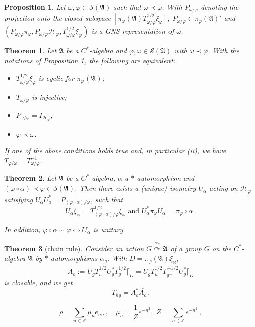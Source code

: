 \documentclass[10pt,a4paper]{amsart}
\newtheorem{thm}{Theorem}
\newtheorem{prop}{Proposition}
\def\a{\alpha}
\def\ch{{\mathcal H}}
\def\cs{{\mathcal S}}
\def\f{\varphi}\def\ff{\phi} \def\F{\Phi}
\def\ga{{\mathfrak A}} \def\gpa{{\mathfrak a}}
\def\om{\omega} \def\Om{\Omega}
\begin{document}
\begin{prop}
\label{pi}
Let $\omega,\varphi\in\cs(\ga)$ such that $\omega\prec\varphi$. With $P_{\om/\f}$ denoting the projection onto the closed subspace $[\pi_\f(\ga)T^{1/2}_{\om/\f}\xi_\f]$, $P_{\om/\f}\in\pi_\f(\ga)'$ and 
$(P_{\om/\f}\pi_\f,  P_{\om/\f}\ch_\f, T^{1/2}_{\om/\f}\xi_\f)$ is a GNS representation of $\om$.
\end{prop}

\begin{thm}
\label{invinv}
Let $\ga$ be a $C^*$-algebra and $\f,\om\in\cs(\ga)$ with $\om\prec\f$. 
With the notations of Proposition \ref{pi}, the following are equivalent:
\begin{itemize}
\item[(i)] $T_{\om/\f}^{1/2}\xi_\f$ is cyclic for $\pi_\f(\ga)$;
\item[(ii)] $T_{\om/\f}$ is injective;
\item[(iii)] $P_{\om/\f}=I_{\mathcal H_\varphi}$;
\item[(iv)]  $\f\prec\om$.
\end{itemize}
If one of the above conditions holds true and, in particular (ii),
we have $T_{\f/\om}=T_{\om/\f}^{-1}$.
\end{thm}

\begin{thm}
\label{twogns}
Let $\ga$ be a $C^*$-algebra, $\a$ a $*$-automorphism and $(\f\circ\a)\prec\f\in\cs(\ga)$. Then there exists a (unique) isometry $U_\a$ acting on $\ch_\f$ satisfying $U_\a U_a^*=P_{(\f\circ\a)/\f}$, such that
$$
U_\a\xi_\f=T^{1/2}_{(\f\circ\a)/\f}\xi_\f\,\,\text{and}\,\, U^*_\a\pi_\f U_\a=\pi_\f\circ\a\,.
$$

In addition, $\f\circ\a\sim\f\iff U_\a$ is unitary.
\end{thm}

\begin{thm}[chain rule]
\label{lenire}
Consider an action $G\stackrel{\a_g}{\curvearrowright}\ga$ of a group $G$ on the $C^*$-algebra $\ga$ by $*$-automorphisms $\a_g$. With $D=\pi_\f(\ga)\xi_\f$, 
\begin{equation}
\label{relautz}
A_o:=U_g T_h^{1/2}U_g^*T_g^{1/2}\lceil_D=U_g T_h^{1/2}T_{g^{-1}}^{-1/2}U_g^*\lceil_D
\end{equation}
is closable, and we get
$$
T_{hg}=A_o^*\overline{A_o}\,.
$$
\end{thm}

\begin{equation}
\label{ohrs}
\rho=\sum_{n\in\mathbb Z}\mu_ne_{nn}\,,\quad
\mu_n=\frac{1}{Z}e^{- n^2},\,\, Z=\sum_{n\in\mathbb Z}e^{-n^2}\,,
\end{equation}
\end{document}
